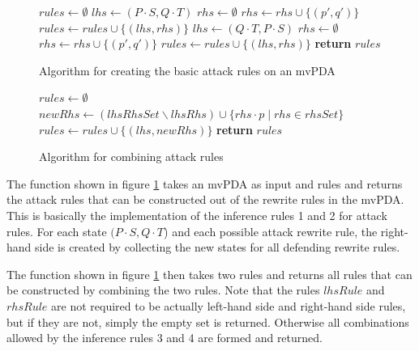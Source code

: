 \begin{figure}[H]
\begin{algorithmic}[1]
  \State $rules ← ∅$
      \State $lhs ← (P⋅S, Q⋅T)$
        \State $rhs ← ∅$
          \State $rhs ← rhs ∪ \{ (p', q') \}$
        \EndFor
        \State $rules ← rules ∪ \{(lhs, rhs)\}$
      \EndFor
      \State $lhs ← (Q⋅T, P⋅S)$
        \State $rhs ← ∅$
          \State $rhs ← rhs ∪ \{ (p', q') \}$
        \EndFor
        \State $rules ← rules ∪ \{(lhs, rhs)\}$
      \EndFor
  \EndFor
  \State \textbf{return} $rules$
\EndFunction
\end{algorithmic}
\caption{Algorithm for creating the basic attack rules on an mvPDA}
\label{alg:make-rules}
\end{figure}

\begin{figure}[H]
\begin{algorithmic}[1]
  \State $rules ← ∅$
      \State $newRhs ← (lhsRhsSet ∖ lhsRhs) ∪ \{ rhs⋅p \mid rhs ∈ rhsSet \}$
      \State $rules ← rules ∪ \{ (lhs, newRhs) \}$
    \EndFor
  \EndIf
  \State \textbf{return} $rules$
\EndFunction
\end{algorithmic}
\caption{Algorithm for combining attack rules}
\label{alg:rule-combining}
\end{figure}

The function {} shown in figure \ref{alg:make-rules}
takes an mvPDA as input and rules and returns the attack rules
that can be constructed out of the rewrite rules in the mvPDA.
This is basically the implementation of the inference rules 1 and 2
for attack rules. For each state $(P⋅S,Q⋅T$) and each possible attack rewrite rule,
the right-hand side is created by collecting the new states for all
defending rewrite rules.

The function {} shown in figure \ref{alg:make-rules}
then takes two rules and returns all rules that can be constructed by
combining the two rules.
Note that the rules $lhsRule$ and $rhsRule$ are not required to
be actually left-hand side and right-hand side rules, but if they are
not, simply the empty set is returned.
Otherwise all combinations allowed by the inference rules 3 and 4
are formed and returned.

